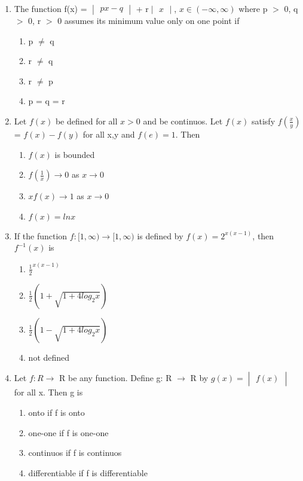 \begin{enumerate}[label=\arabic*.,ref=\thesubsection.\theenumi]
\item The function f(x) = $\begin{vmatrix} px-q \end{vmatrix}$ + r$\begin{vmatrix} x \end{vmatrix}$,
 $x \in (-\infty,\infty)$ where p $>$ 0, q $>$ 0, r $>$ 0 assumes its minimum value only on one point if
\begin{enumerate}
\item p $\neq$ q
\item r $\neq$ q
\item r $\neq$ p
\item p = q = r
\end{enumerate}

\item Let $f(x)$ be defined for all $x > 0$ and be continuos. Let $f(x)$ satisfy $f(\frac{x}{y})$ = $f(x)-f(y)$ for all x,y and $f(e)=1$. Then
\begin{enumerate}
\item $f(x)$ is bounded
\item $f(\frac{1}{x}) \to 0$ as $x \to 0$
\item $xf(x)\to 1$ as $x \to 0$
\item $f(x)=ln x$
\end{enumerate}

\item If the function $f:[1,\infty) \rightarrow [1,\infty)$ is defined by $f(x)=2^{x(x-1)}$, then $f^{-1}(x)$ is
\begin{enumerate}
\item $\frac{1}{2}^{x(x-1)}$
\item $\frac{1}{2}(1+\sqrt{1+4log_2x})$
\item $\frac{1}{2}(1-\sqrt{1+4log_2x})$
\item not defined
\end{enumerate}

\item Let $f: R\rightarrow$ R be any function. Define g: R $\rightarrow$ R by $g(x)=\begin{vmatrix} f(x) \end{vmatrix}$ for all x. Then g is
\begin{enumerate}
\item onto if f is onto
\item one-one if f is one-one
\item continuos if f is continuos
\item differentiable if f is differentiable
\end{enumerate} 


\end{enumerate}
